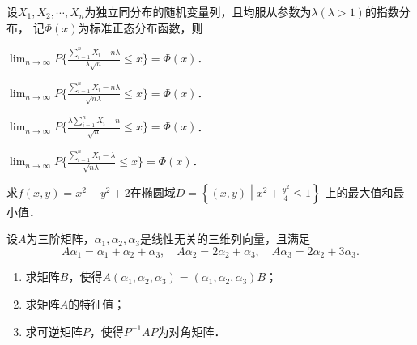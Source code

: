 \documentclass[plain,noanswer,medmath]{../../template/jnuexam}
\begin{document}


\begin{problem}
设$X_1,X_2, \cdots ,X_n$为独立同分布的随机变量列，且均服从参数为$\lambda (\lambda > 1)$的指数分布，
记$\Phi (x)$为标准正态分布函数，则\pickout{}
\begin{abcd}
\item $\lim_{n \to \infty} P\Bigg\{\frac{\sum_{i=1}^n X_i - n\lambda}{\lambda\sqrt{n}} \le x \Bigg\}
       = \Phi(x)$．
\item $\lim_{n \to \infty} P\Bigg\{\frac{\sum_{i=1}^n X_i - n\lambda}{\sqrt{n\lambda}} \le x \Bigg\}
       = \Phi(x)$．
\item $\lim_{n \to \infty} P\Bigg\{\frac{\lambda \sum_{i=1}^n X_i - n}{\sqrt{n}} \le x \Bigg\}
       = \Phi(x)$．
\item $\lim_{n \to \infty} P\Bigg\{\frac{\sum_{i=1}^n X_i - \lambda}{\sqrt{n\lambda}} \le x \Bigg\}
       = \Phi(x)$．
\end{abcd}
\end{problem}










\begin{problem}[points=9]
求$f(x,y) = x^2 - y^2 + 2$在椭圆域$D = \left\{(x,y)\middle|x^2 + \frac{y^2}{4} \le 1 \right\}$
上的最大值和最小值．
\end{problem}






\begin{problem}[points=13]
设$A$为三阶矩阵，$\alpha_1,\alpha_2,\alpha_3$是线性无关的三维列向量，且满足
$$A\alpha_1 = \alpha_1 + \alpha_2 + \alpha_3,\quad A\alpha_2 = 2\alpha_2 + \alpha_3,
   \quad A\alpha_3 = 2\alpha_2 + 3\alpha_3.$$
\begin{enumerate}
\item 求矩阵$B$，使得$A(\alpha_1,\alpha_2,\alpha_3) = (\alpha_1,\alpha_2,\alpha_3)B$；
\item 求矩阵$A$的特征值；
\item 求可逆矩阵$P$，使得$P^{-1} AP$为对角矩阵．
\end{enumerate}
\end{problem}
\end{document}
